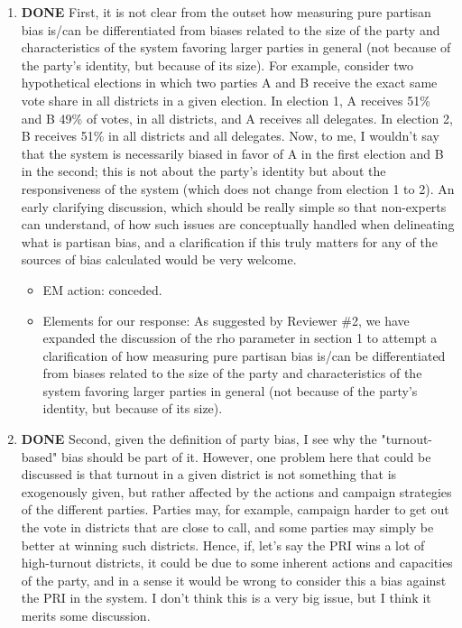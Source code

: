 \documentclass{article}
\begin{document}
\begin{enumerate}
\item {\bfseries\sffamily DONE} First, it is not clear from the outset how measuring pure partisan bias is/can be differentiated from biases related to the size of the party and characteristics of the system favoring larger parties in general (not because of the party's identity, but because of its size). For example, consider two hypothetical elections in which two parties A and B receive the exact same vote share in all districts in a given election. In election 1, A receives 51\% and B 49\% of votes, in all districts, and A receives all delegates. In election 2, B receives 51\% in all districts and all delegates. Now, to me, I wouldn't say that the system is necessarily biased in favor of  A in the first election and B in the second; this is not about the party's identity but about the responsiveness of the system (which does not change from election 1 to 2). An early clarifying discussion, which should be really simple so that non-experts can understand, of how such issues are conceptually handled when delineating what is partisan bias, and a clarification if this truly matters for any of the sources of bias calculated would be very welcome.
\label{sec:orgheadline9}
\begin{itemize}
\item EM action: conceded.
\item Elements for our response: As suggested by Reviewer \#2, we have expanded the discussion of the rho parameter in section 1 to attempt a clarification of how measuring pure partisan bias is/can be differentiated from biases related to the size of the party and characteristics of the system favoring larger parties in general (not because of the party's identity, but because of its size).
\end{itemize}
\item {\bfseries\sffamily DONE} Second, given the definition of party bias, I see why the "turnout-based" bias should be part of it. However, one problem here that could be discussed is that turnout in a given district is not something that is exogenously given, but rather affected by the actions and campaign strategies of the different parties. Parties may, for example, campaign harder to get out the vote in districts that are close to call, and some parties may simply be better at winning such districts. Hence, if, let's say the PRI wins a lot of high-turnout districts, it could be due to some inherent actions and capacities of the party, and in a sense it would be wrong to consider this a bias against the PRI in the system. I don't think this is a very big issue, but I think it merits some discussion.

\end{enumerate}
\end{document}
